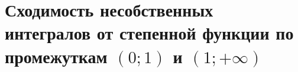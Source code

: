 \documentclass[../main.tex]{subfiles}
\begin{document}
\newpage
\section{Сходимость несобственных интегралов от степенной функции по промежуткам \((0; 1)\) и \( (1; + \infty )\)}
\end{document}
